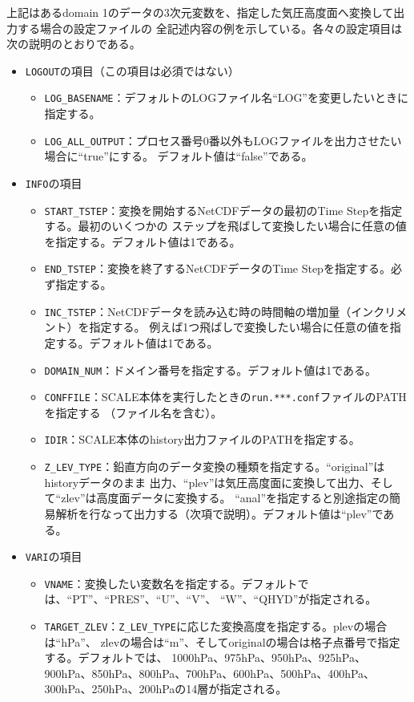 \noindent 上記はあるdomain 1のデータの3次元変数を、指定した気圧高度面へ変換して出力する場合の設定ファイルの
全記述内容の例を示している。各々の設定項目は次の説明のとおりである。
\begin{itemize}
 \item \verb|LOGOUT|の項目（この項目は必須ではない）
 \begin{itemize}
  \item \verb|LOG_BASENAME|：デフォルトのLOGファイル名``LOG''を変更したいときに指定する。
  \item \verb|LOG_ALL_OUTPUT|：プロセス番号0番以外もLOGファイルを出力させたい場合に``true''にする。
        デフォルト値は``false''である。
 \end{itemize}
 \item \verb|INFO|の項目
 \begin{itemize}
  \item \verb|START_TSTEP|：変換を開始するNetCDFデータの最初のTime Stepを指定する。最初のいくつかの
        ステップを飛ばして変換したい場合に任意の値を指定する。デフォルト値は1である。
  \item \verb|END_TSTEP|：変換を終了するNetCDFデータのTime Stepを指定する。必ず指定する。
  \item \verb|INC_TSTEP|：NetCDFデータを読み込む時の時間軸の増加量（インクリメント）を指定する。
        例えば1つ飛ばしで変換したい場合に任意の値を指定する。デフォルト値は1である。
  \item \verb|DOMAIN_NUM|：ドメイン番号を指定する。デフォルト値は1である。
  \item \verb|CONFFILE|：SCALE本体を実行したときの\verb|run.***.conf|ファイルのPATHを指定する
        （ファイル名を含む）。
  \item \verb|IDIR|：SCALE本体のhistory出力ファイルのPATHを指定する。
  \item \verb|Z_LEV_TYPE|：鉛直方向のデータ変換の種類を指定する。``original''はhistoryデータのまま
        出力、``plev''は気圧高度面に変換して出力、そして``zlev''は高度面データに変換する。
        ``anal''を指定すると別途指定の簡易解析を行なって出力する（次項で説明）。デフォルト値は``plev''である。
 \end{itemize}
 \item \verb|VARI|の項目
 \begin{itemize}
  \item \verb|VNAME|：変換したい変数名を指定する。デフォルトでは、``PT''、``PRES''、``U''、``V''、
        ``W''、``QHYD''が指定される。
  \item \verb|TARGET_ZLEV|：\verb|Z_LEV_TYPE|に応じた変換高度を指定する。plevの場合は``hPa''、
        zlevの場合は``m''、そしてoriginalの場合は格子点番号で指定する。デフォルトでは、
        1000hPa、975hPa、950hPa、925hPa、900hPa、850hPa、800hPa、700hPa、600hPa、500hPa、400hPa、
        300hPa、250hPa、200hPaの14層が指定される。 
 \end{itemize}
\end{itemize}

